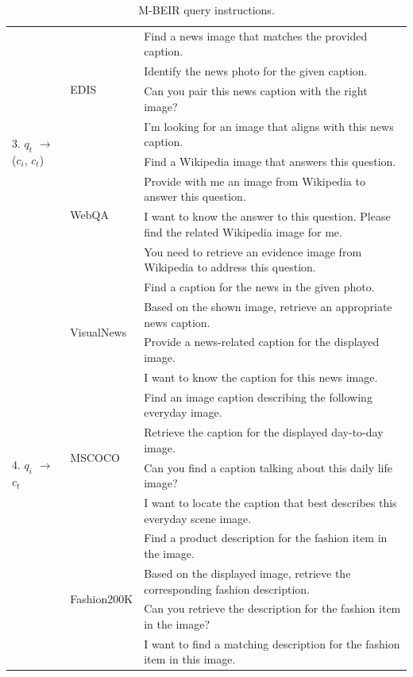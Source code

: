 \begin{table}
\begin{tabular}{l l l}
         \midrule
         \multirow{8}{*}{3. $q_t$ $\to$ ($c_i$, $c_t$)}
         & \multirow{4}{*}{EDIS}                      &  Find a news image that matches the provided caption. \\
         &&  Identify the news photo for the given caption. \\
         &&  Can you pair this news caption with the right image? \\
         &&  I'm looking for an image that aligns with this news caption. \\
         \cmidrule(lr){2-3}
         & \multirow{4}{*}{WebQA}                     & Find a Wikipedia image that answers this question. \\
         && Provide with me an image from Wikipedia to answer this question. \\
         && I want to know the answer to this question. Please find the related Wikipedia image for me. \\
         && You need to retrieve an evidence image from Wikipedia to address this question. \\
         \midrule
         \multirow{12}{*}{4. $q_{i}$ $\to$ $c_t$} 
         & \multirow{4}{*}{VisualNews}                &  Find a caption for the news in the given photo. \\
         & & Based on the shown image, retrieve an appropriate news caption. \\
         & & Provide a news-related caption for the displayed image. \\
         & & I want to know the caption for this news image. \\
         \cmidrule(lr){2-3}
         & \multirow{4}{*}{MSCOCO}                  & Find an image caption describing the following everyday image. \\
         && Retrieve the caption for the displayed day-to-day image. \\
         && Can you find a caption talking about this daily life image? \\
         && I want to locate the caption that best describes this everyday scene image. \\
         \cmidrule(lr){2-3}
         & \multirow{4}{*}{Fashion200K}            & Find a product description for the fashion item in the image.  \\
         && Based on the displayed image, retrieve the corresponding fashion description.  \\
         && Can you retrieve the description for the fashion item in the image?  \\
         && I want to find a matching description for the fashion item in this image.  \\
         \bottomrule
    \end{tabular}
    \caption{M-BEIR query instructions.}
    \label{tab:instructions}
\end{table}

